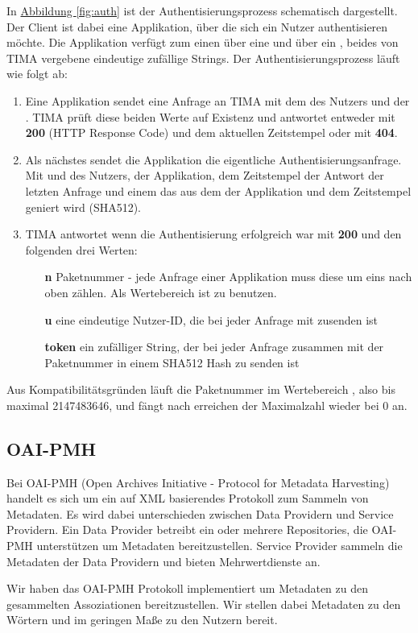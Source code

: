 In \hyperref[fig:auth]{Abbildung \ref*{fig:auth}} ist der Authentisierungsprozess schematisch dargestellt. Der Client ist dabei eine Applikation, über die sich ein Nutzer authentisieren möchte. Die Applikation verfügt zum einen über eine  und über ein , beides von TIMA vergebene eindeutige zufällige Strings. Der Authentisierungsprozess läuft wie folgt ab:
\begin{enumerate}
	\item Eine Applikation sendet eine Anfrage an TIMA mit dem  des Nutzers und der . TIMA prüft diese beiden Werte auf Existenz und antwortet entweder mit \textbf{200} (HTTP Response Code) und dem aktuellen Zeitstempel oder mit \textbf{404}.
	\item Als nächstes sendet die Applikation die eigentliche Authentisierungsanfrage. Mit  und  des Nutzers,  der Applikation, dem Zeitstempel der Antwort der letzten Anfrage und einem  das aus dem  der Applikation und dem Zeitstempel geniert wird (SHA512).
	\item TIMA antwortet wenn die Authentisierung erfolgreich war mit \textbf{200} und den folgenden drei Werten:
	\begin{itemize}
    \item[\textbf{n}] Paketnummer - jede Anfrage einer Applikation muss diese um eins nach oben zählen. Als Wertebereich ist  zu benutzen.
    \item[\textbf{u}] eine eindeutige Nutzer-ID, die bei jeder Anfrage mit zusenden ist
    \item[\textbf{token}] ein zufälliger String, der bei jeder Anfrage zusammen mit der Paketnummer  in einem SHA512 Hash zu senden ist
	\end{itemize}
\end{enumerate}

Aus Kompatibilitätsgründen läuft die Paketnummer im Wertebereich , also bis maximal 2147483646, und fängt nach erreichen der Maximalzahl wieder bei 0 an.

\subsection{OAI-PMH}\label{sec:oai-pmh} %
Bei OAI-PMH (Open Archives Initiative - Protocol for Metadata Harvesting) handelt es sich um ein auf XML basierendes Protokoll zum Sammeln von Metadaten. Es wird dabei unterschieden zwischen Data Providern und Service Providern. Ein Data Provider betreibt ein oder mehrere Repositories, die OAI-PMH unterstützen um Metadaten bereitzustellen. Service Provider sammeln die Metadaten der Data Providern und bieten Mehrwertdienste an.

Wir haben das OAI-PMH Protokoll implementiert um Metadaten zu den gesammelten Assoziationen bereitzustellen. Wir stellen dabei Metadaten zu den Wörtern und im geringen Maße zu den Nutzern bereit.

